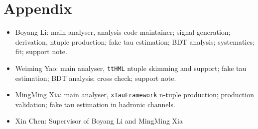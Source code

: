 \documentclass[UKenglish,texlive=2020]{\ATLASLATEXPATH atlasdoc}
\begin{document}
\maketitle

\tableofcontents

\newpage

\linenumbers










\clearpage
\appendix
\part*{Appendix}




%
%
%
%
%
%
%
\clearpage

\printbibliography
%
%

\clearpage
{}

\begin{itemize}
\item Boyang Li: main analyser, analysis code maintainer; signal generation; derivation, ntuple production; fake tau estimation; BDT analysis; systematics; fit; support note.
\item Weiming Yao: main analyser, \texttt{ttHML} ntuple skimming and support; fake tau estimation; BDT analysis; cross check; support note.
\item MingMing Xia: main analyser, \texttt{xTauFramework} n-tuple production; production validation; fake tau estimation in hadronic channels.
\item Xin Chen: Supervisor of Boyang Li and MingMing Xia
\end{itemize}
\end{document}
